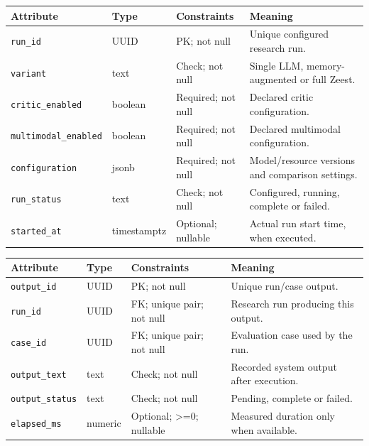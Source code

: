 \begin{reporttable}
\setlength{\tabcolsep}{5pt}
\centering
\small
\caption{EvaluationRun attributes, types and constraints.}
\label{tab:kashaf:dict-evaluationrun}
\begin{tabular}{|p{}|p{}|p{}|p{}|}
\hline
Attribute & Type & Constraints & Meaning \\ \hline
\texttt{run\_id} & UUID & PK; not null & Unique configured research run. \\ \hline
\texttt{variant} & text & Check; not null & Single LLM, memory-augmented or full Zeest. \\ \hline
\texttt{critic\_enabled} & boolean & Required; not null & Declared critic configuration. \\ \hline
\texttt{multimodal\_enabled} & boolean & Required; not null & Declared multimodal configuration. \\ \hline
\texttt{configuration} & jsonb & Required; not null & Model/resource versions and comparison settings. \\ \hline
\texttt{run\_status} & text & Check; not null & Configured, running, complete or failed. \\ \hline
\texttt{started\_at} & timestamptz & Optional; nullable & Actual run start time, when executed. \\ \hline
\end{tabular}
\end{reporttable}

\begin{reporttable}
\setlength{\tabcolsep}{5pt}
\centering
\small
\caption{EvaluationOutput attributes, types and constraints.}
\label{tab:kashaf:dict-evaluationoutput}
\begin{tabular}{|p{}|p{}|p{}|p{}|}
\hline
Attribute & Type & Constraints & Meaning \\ \hline
\texttt{output\_id} & UUID & PK; not null & Unique run/case output. \\ \hline
\texttt{run\_id} & UUID & FK; unique pair; not null & Research run producing this output. \\ \hline
\texttt{case\_id} & UUID & FK; unique pair; not null & Evaluation case used by the run. \\ \hline
\texttt{output\_text} & text & Check; not null & Recorded system output after execution. \\ \hline
\texttt{output\_status} & text & Check; not null & Pending, complete or failed. \\ \hline
\texttt{elapsed\_ms} & numeric & Optional; >=0; nullable & Measured duration only when available. \\ \hline
\end{tabular}
\end{reporttable}


